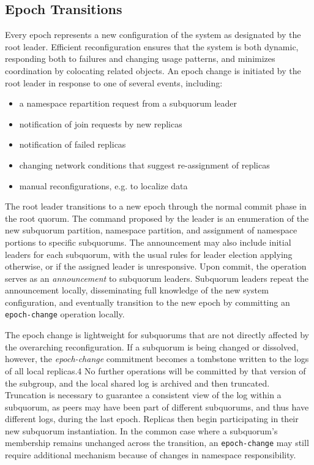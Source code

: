 \subsection{Epoch Transitions}
\label{ch03_epoch_transitions}


Every epoch represents a new configuration of the system as designated by the root leader.
Efficient reconfiguration ensures that the system is both dynamic, responding both to failures and changing usage patterns, and minimizes coordination by colocating related objects.
An epoch change is initiated by the root leader in response to one of several events, including:

\renewcommand{\baselinestretch}{1}
\begin{itemize}
    \item a namespace repartition request from a subquorum leader
    \item notification of join requests by new replicas
    \item notification of failed replicas
    \item changing network conditions that suggest re-assignment of replicas
    \item manual reconfigurations, e.g. to localize data
\end{itemize}
\renewcommand{\baselinestretch}{2}

The root leader transitions to a new epoch through the normal commit phase in the root quorum.
The command proposed by the leader is an enumeration of the new subquorum partition, namespace partition, and assignment of namespace portions to specific subquorums.
The announcement may also include initial leaders for each subquorum, with the usual rules for leader election applying otherwise, or if the assigned leader is unresponsive.
Upon commit, the operation serves as an \emph{announcement} to subquorum leaders.
Subquorum leaders repeat the announcement locally, disseminating full knowledge of the new system configuration, and eventually transition to the new epoch by committing an \texttt{epoch-change} operation locally.

The epoch change is lightweight for subquorums that are not directly affected by the overarching reconfiguration.
If a subquorum is being changed or dissolved, however, the \emph{epoch-change} commitment becomes a tombstone written to the logs of all local replicas.4
No further operations will be committed by that version of the subgroup, and the local shared log is archived and then truncated.
Truncation is necessary to guarantee a consistent view of the log within a subquorum, as peers may have been part of different subquorums, and thus have different logs, during the last epoch.
Replicas then begin participating in their new subquorum instantiation.
In the common case where a subquorum's membership remains unchanged across the transition, an \texttt{epoch-change} may still require additional mechanism because of changes in namespace responsibility.

